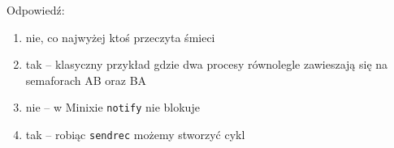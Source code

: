 Odpowiedź:
\begin{enumerate}
	\item nie, co najwyżej ktoś przeczyta śmieci
	\item tak -- klasyczny przykład gdzie dwa procesy równolegle zawieszają się na semaforach AB oraz BA
	\item nie -- w Minixie \texttt{notify} nie blokuje
	\item tak -- robiąc \texttt{sendrec} możemy stworzyć cykl
\end{enumerate}
